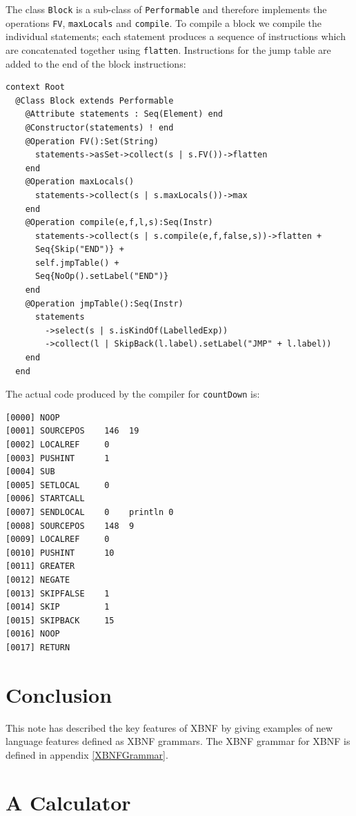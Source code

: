 \documentclass{article}
\begin{document}
The class {\tt Block} is a sub-class of {\tt Performable} and therefore
implements the operations {\tt FV}, {\tt maxLocals} and {\tt compile}.
To compile a block we compile the individual statements; each statement
produces a sequence of instructions which are concatenated together using
{\tt flatten}. Instructions for the jump table are added to the end of the
block instructions:
\begin{verbatim}
context Root
  @Class Block extends Performable
    @Attribute statements : Seq(Element) end
    @Constructor(statements) ! end
    @Operation FV():Set(String)
      statements->asSet->collect(s | s.FV())->flatten
    end
    @Operation maxLocals()
      statements->collect(s | s.maxLocals())->max
    end
    @Operation compile(e,f,l,s):Seq(Instr)
      statements->collect(s | s.compile(e,f,false,s))->flatten +
      Seq{Skip("END")} +
      self.jmpTable() +
      Seq{NoOp().setLabel("END")}
    end
    @Operation jmpTable():Seq(Instr)
      statements
        ->select(s | s.isKindOf(LabelledExp))
        ->collect(l | SkipBack(l.label).setLabel("JMP" + l.label)) 
    end
  end
\end{verbatim}
The actual code produced by the compiler for {\tt countDown} is:
\begin{verbatim}
[0000] NOOP
[0001] SOURCEPOS    146  19
[0002] LOCALREF     0
[0003] PUSHINT      1
[0004] SUB
[0005] SETLOCAL     0
[0006] STARTCALL
[0007] SENDLOCAL    0    println 0
[0008] SOURCEPOS    148  9
[0009] LOCALREF     0
[0010] PUSHINT      10
[0011] GREATER
[0012] NEGATE
[0013] SKIPFALSE    1
[0014] SKIP         1
[0015] SKIPBACK     15
[0016] NOOP
[0017] RETURN
\end{verbatim}

\section{Conclusion}

This note has described the key features of XBNF by giving examples of new language
features defined as XBNF grammars. The XBNF grammar for XBNF is defined in appendix
\ref{XBNFGrammar}.

\appendix

\section{A Calculator}

\label{calculator}
\end{document}
